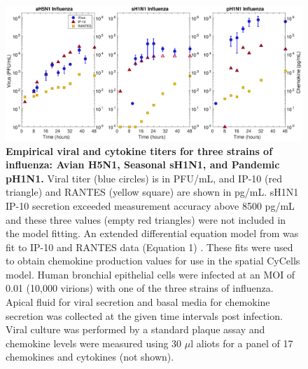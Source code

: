 \documentclass[preprint,10pt,numbers]{elsarticle}
\begin{document}
\begin{figure}[!ht]
\begin{center}
 \includegraphics[width=\textwidth]{Figure_3}
 \end{center}
\caption{{\bf Empirical viral and cytokine titers for three strains of influenza: Avian H5N1, Seasonal sH1N1, and Pandemic pH1N1.}  Viral titer (blue circles) is in PFU/mL, and IP-10 (red triangle) and RANTES (yellow square) are shown in pg/mL.   sH1N1 IP-10 secretion exceeded measurement accuracy above 8500 pg/mL and these three values (empty red triangles) were not included in the model fitting.  An extended differential equation model from \citep{Mitchell2011} was fit to IP-10 and RANTES data (Equation 1) .  These fits were used to obtain chemokine production values for use in the spatial CyCells model.  Human bronchial epithelial cells were infected at an MOI of 0.01 (10,000 virions) with one of the three strains of influenza.  Apical fluid for viral secretion and basal media for chemokine secretion was collected at the given time intervals post infection.  Viral culture was performed by a standard plaque assay and chemokine levels were measured using 30 $\mu$l aliots for a panel of 17 chemokines and cytokines (not shown).} 
 \label{fig:data}
\end{figure}
\end{document}
